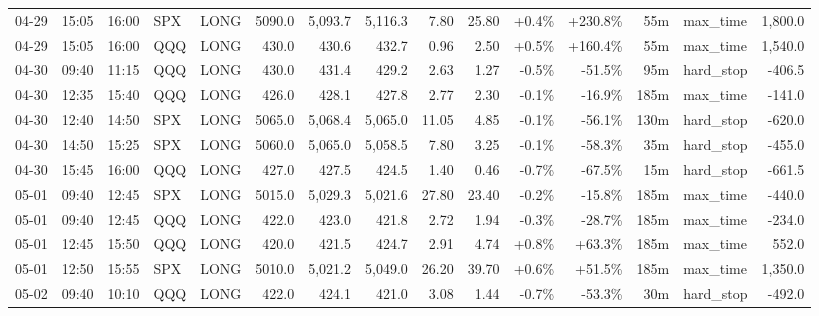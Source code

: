 \documentclass[11pt,a4paper,twoside]{article}
\begin{document}
\begin{landscape}
\begin{center}
\begin{longtable}{>{\color{txtmain}}l l l l l r r r r r r r r >{\color{txtmain}}l r}
04-29 & 15:05 & 16:00 & SPX & LONG & 5090.0 & 5,093.7 & 5,116.3 & 7.80 & 25.80 & \textcolor{wingreen}{+0.4\%} & \textcolor{wingreen}{+230.8\%} & 55m & max\_time & \textcolor{wingreen}{1,800.0} \\
04-29 & 15:05 & 16:00 & QQQ & LONG & 430.0 & 430.6 & 432.7 & 0.96 & 2.50 & \textcolor{wingreen}{+0.5\%} & \textcolor{wingreen}{+160.4\%} & 55m & max\_time & \textcolor{wingreen}{1,540.0} \\
04-30 & 09:40 & 11:15 & QQQ & LONG & 430.0 & 431.4 & 429.2 & 2.63 & 1.27 & \textcolor{lossred}{-0.5\%} & \textcolor{lossred}{-51.5\%} & 95m & hard\_stop & \textcolor{lossred}{-406.5} \\
04-30 & 12:35 & 15:40 & QQQ & LONG & 426.0 & 428.1 & 427.8 & 2.77 & 2.30 & \textcolor{lossred}{-0.1\%} & \textcolor{lossred}{-16.9\%} & 185m & max\_time & \textcolor{lossred}{-141.0} \\
04-30 & 12:40 & 14:50 & SPX & LONG & 5065.0 & 5,068.4 & 5,065.0 & 11.05 & 4.85 & \textcolor{lossred}{-0.1\%} & \textcolor{lossred}{-56.1\%} & 130m & hard\_stop & \textcolor{lossred}{-620.0} \\
04-30 & 14:50 & 15:25 & SPX & LONG & 5060.0 & 5,065.0 & 5,058.5 & 7.80 & 3.25 & \textcolor{lossred}{-0.1\%} & \textcolor{lossred}{-58.3\%} & 35m & hard\_stop & \textcolor{lossred}{-455.0} \\
04-30 & 15:45 & 16:00 & QQQ & LONG & 427.0 & 427.5 & 424.5 & 1.40 & 0.46 & \textcolor{lossred}{-0.7\%} & \textcolor{lossred}{-67.5\%} & 15m & hard\_stop & \textcolor{lossred}{-661.5} \\
05-01 & 09:40 & 12:45 & SPX & LONG & 5015.0 & 5,029.3 & 5,021.6 & 27.80 & 23.40 & \textcolor{lossred}{-0.2\%} & \textcolor{lossred}{-15.8\%} & 185m & max\_time & \textcolor{lossred}{-440.0} \\
05-01 & 09:40 & 12:45 & QQQ & LONG & 422.0 & 423.0 & 421.8 & 2.72 & 1.94 & \textcolor{lossred}{-0.3\%} & \textcolor{lossred}{-28.7\%} & 185m & max\_time & \textcolor{lossred}{-234.0} \\
05-01 & 12:45 & 15:50 & QQQ & LONG & 420.0 & 421.5 & 424.7 & 2.91 & 4.74 & \textcolor{wingreen}{+0.8\%} & \textcolor{wingreen}{+63.3\%} & 185m & max\_time & \textcolor{wingreen}{552.0} \\
05-01 & 12:50 & 15:55 & SPX & LONG & 5010.0 & 5,021.2 & 5,049.0 & 26.20 & 39.70 & \textcolor{wingreen}{+0.6\%} & \textcolor{wingreen}{+51.5\%} & 185m & max\_time & \textcolor{wingreen}{1,350.0} \\
05-02 & 09:40 & 10:10 & QQQ & LONG & 422.0 & 424.1 & 421.0 & 3.08 & 1.44 & \textcolor{lossred}{-0.7\%} & \textcolor{lossred}{-53.3\%} & 30m & hard\_stop & \textcolor{lossred}{-492.0} \\

\end{longtable}
\end{center}
\end{landscape}
\end{document}
